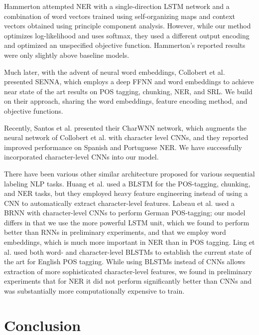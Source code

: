 \documentclass[11pt,letterpaper]{article}
\begin{document}
Hammerton  attempted NER with a single-direction LSTM network and a combination of word vectors trained using self-organizing maps and context vectors obtained using principle component analysis. However, while our method optimizes log-likelihood and uses softmax, they used a different output encoding and optimized an unspecified objective function. Hammerton's  reported results were only slightly above baseline models. 

Much later, with the advent of neural word embeddings, Collobert et al.  presented SENNA, which employs a deep FFNN and word embeddings to achieve near state of the art results on POS tagging, chunking, NER, and SRL. We build on their approach, sharing the word embeddings, feature encoding method, and objective functions.

Recently, Santos et al.  presented their CharWNN network, which augments the neural network of Collobert et al.  with character level CNNs, and they reported improved performance on Spanish and Portuguese NER. We have successfully incorporated character-level CNNs into our model. 

There have been various other similar architecture proposed for various sequential labeling NLP tasks.
Huang et al.  used a BLSTM for the POS-tagging, chunking, and NER tasks, but they employed heavy feature engineering instead of using a CNN to automatically extract character-level features. 
Labeau et al.  used a BRNN with character-level CNNs to perform German POS-tagging; our model differs in that we use the more powerful LSTM unit, which we found to perform better than RNNs in preliminary experiments, and that we employ word embeddings, which is much more important in NER than in POS tagging.
Ling et al.  used both word- and character-level BLSTMs to establish the current state of the art for English POS tagging. While using BLSTMs instead of CNNs allows extraction of more sophisticated character-level features, we found in preliminary experiments that for NER it did not perform significantly better than CNNs and was substantially more computationally expensive to train.



\section{Conclusion}
\end{document}
